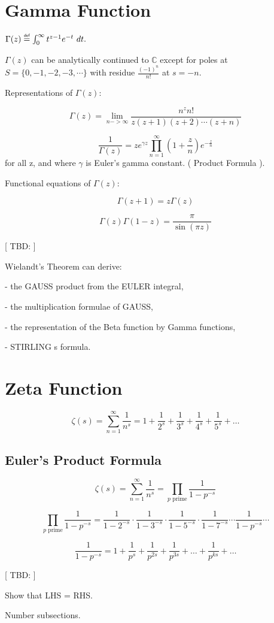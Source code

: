 \newpage

\section{Gamma Function}

$\Gamma(z) \myeq \int_{0}^{\infty} t^{z-1} e^{-t}\ dt .$ 

\noindent $\Gamma(z)$ can be analytically continued to $\mathbb{C}$ except for
poles at $S=\{0, -1, -2, -3, \cdots \}$ with residue $\frac{(-1)^n}{n!}$ at
$s=-n$.

Representations of $\Gamma(z)$:

$$\Gamma(z) = \lim_{n->\infty} \frac{n^{z}n!}{z(z+1)(z+2) \cdots (z+n)}$$

$$\frac{1}{\Gamma(z)} = z e^{\gamma z} \prod_{n=1}^{\infty}
(1+\frac{z}{n})e^{-\frac{z}{n}}$$
for all z, and where $\gamma$ is Euler's gamma constant. ( Product Formula ).

Functional equations of $\Gamma(z)$:

$$\Gamma(z+1) = z \Gamma(z)$$

$$\Gamma(z)\Gamma(1-z) = \frac{\pi}{\sin{(\pi z)}}$$


[ TBD: ]

Wielandt's Theorem can derive:

- the GAUSS product from the EULER integral,

- the multiplication formulae of GAUSS,

- the representation of the Beta function by Gamma functions,

- STIRLING s formula.


\section{Zeta Function}

$$\zeta(s) = \sum_{n=1}^\infty\frac{1}{n^s} = 1+\frac{1}{2^s}+\frac{1}{3^s}+\frac{1}{4^s}+\frac{1}{5^s}+ \ldots$$

\subsection{Euler's Product Formula}

$$\zeta(s) = \sum_{n=1}^\infty\frac{1}{n^s} = \prod_{p \text{ prime}} \frac{1}{1-p^{-s}}$$

$$\prod_{p \text{ prime}} \frac{1}{1-p^{-s}} = \frac{1}{1-2^{-s}}\cdot\frac{1}{1-3^{-s}}\cdot\frac{1}{1-5^{-s}}\cdot\frac{1}{1-7^{-s}} \cdots \frac{1}{1-p^{-s}} \cdots$$

$$ \frac{1}{1-p^{-s}} = 1 + \frac{1}{p^s} + \frac{1}{p^{2s}} + \frac{1}{p^{3s}} + \ldots + \frac{1}{p^{ks}} + \ldots $$ 


[ TBD: ]

Show that LHS = RHS.

Number subsections.
